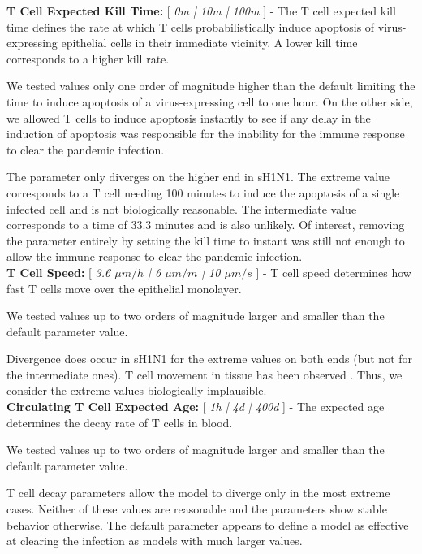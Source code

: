 \documentclass[10pt]{article}
\begin{document}
\textbf{T Cell Expected Kill Time:} [ \textit{0m | 10m | 100m} ]  - The T cell expected kill time defines the rate at which T cells probabilistically induce apoptosis of  virus-expressing epithelial cells in their immediate vicinity.  A lower kill time corresponds to a higher kill rate. 

We tested values only one order of magnitude higher than the default limiting the time to induce apoptosis of a virus-expressing cell to one hour.  On the other side, we allowed T cells to induce apoptosis instantly to see if any delay in the induction of apoptosis was responsible for the inability for the immune response to clear the pandemic infection.

The parameter only diverges on the higher end in sH1N1.  The extreme value corresponds to a T cell needing 100 minutes to induce the apoptosis of a single infected cell and is not biologically reasonable.  The intermediate value corresponds to a time of 33.3 minutes and is also unlikely.  Of interest, removing the parameter entirely by setting the kill time to instant was still not enough to allow the immune response to clear the pandemic infection. \\


\textbf{T Cell Speed:} [ \textit{3.6 $\mu m/h$ | 6 $\mu m/m$ | 10 $\mu m/s$} ] - T cell speed determines how fast T cells move over the epithelial monolayer.

We tested values up to two orders of magnitude larger and smaller than the default parameter value.

Divergence does occur in sH1N1 for the extreme values on both ends (but not for the intermediate ones).  T cell movement in tissue has been observed \cite{Egen2011}.  Thus, we consider the extreme values biologically implausible.  \\


\textbf{Circulating T Cell Expected Age:} [ \textit{1h |  4d | 400d} ] - The expected age determines the decay rate of T cells in blood.  

We tested values up to two orders of magnitude larger and smaller than the default parameter value.

T cell decay parameters allow the model to diverge only in the most extreme cases.  Neither of these values are reasonable and the parameters show stable behavior otherwise.  The default parameter appears to define a model as effective at clearing the infection as models with much larger values. \\
\end{document}
